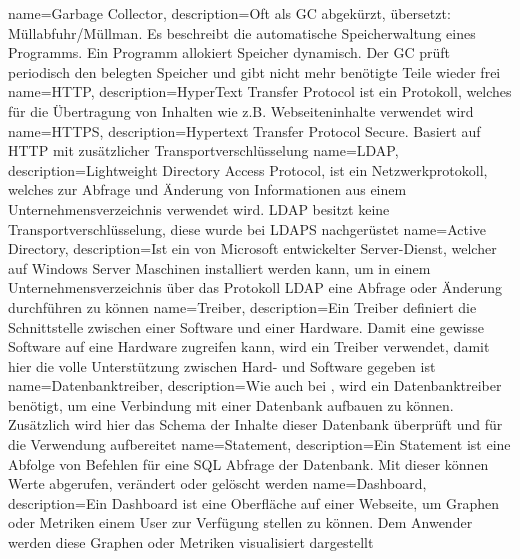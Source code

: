 {
  name=Garbage Collector,
  description={Oft als GC abgekürzt, übersetzt: Müllabfuhr/Müllman. Es
               beschreibt die automatische Speicherwaltung eines Programms.
               Ein Programm allokiert Speicher dynamisch. Der GC prüft
               periodisch den belegten Speicher und gibt nicht mehr benötigte
               Teile wieder frei}
}
{
  name=HTTP,
  description={HyperText Transfer Protocol ist ein
              Protokoll, welches für die Übertragung von Inhalten wie z.B.
              Webseiteninhalte verwendet wird}
}
{
  name=HTTPS,
  description={Hypertext Transfer Protocol Secure. Basiert auf
              \gls{HTTP} mit zusätzlicher Transportverschlüsselung}
}
{
  name=LDAP,
  description={Lightweight Directory Access Protocol, ist
            ein Netzwerkprotokoll, welches zur Abfrage und Änderung von
            Informationen aus einem Unternehmensverzeichnis verwendet wird.
            LDAP besitzt keine Transportverschlüsselung, diese wurde bei LDAPS
            nachgerüstet}
}
{
  name=Active Directory,
  description={Ist ein von Microsoft entwickelter Server-Dienst, welcher auf
              Windows Server Maschinen installiert werden kann, um in einem
              Unternehmensverzeichnis über das Protokoll \gls{LDAP} eine
              Abfrage oder Änderung durchführen zu können}
}
{
  name=Treiber,
  description={Ein Treiber definiert die Schnittstelle zwischen einer
              Software und einer Hardware. Damit eine gewisse Software auf
              eine Hardware zugreifen kann, wird ein Treiber verwendet,
              damit hier die volle Unterstützung zwischen Hard- und Software
              gegeben ist}
}
{
  name=Datenbanktreiber,
  description={Wie auch bei , wird ein
              Datenbanktreiber benötigt, um eine Verbindung mit einer
              Datenbank aufbauen zu können. Zusätzlich wird hier
              das Schema der Inhalte dieser Datenbank überprüft und
              für die Verwendung aufbereitet}
}
{
  name=Statement,
  description={Ein Statement ist eine Abfolge von Befehlen für eine \gls{SQL}
              Abfrage der Datenbank. Mit dieser können Werte abgerufen,
              verändert oder gelöscht werden}
}
{
  name=Dashboard,
  description={Ein Dashboard ist eine Oberfläche auf einer Webseite, um Graphen
              oder Metriken einem User zur Verfügung stellen zu können. Dem
              Anwender werden diese Graphen oder Metriken visualisiert
              dargestellt}
}
